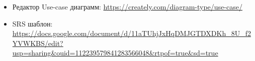 

\begin{itemize}
    \item Редактор Use-case диаграмм:
    \url{https://creately.com/diagram-type/use-case/}
    \item SRS шаблон:
    \url{https://docs.google.com/document/d/11aTUhjJxHqDMJGTDXDKh_8U_f2YVWKBS/edit?usp=sharing&ouid=112239579841283566048&rtpof=true&sd=true}
\end{itemize}
